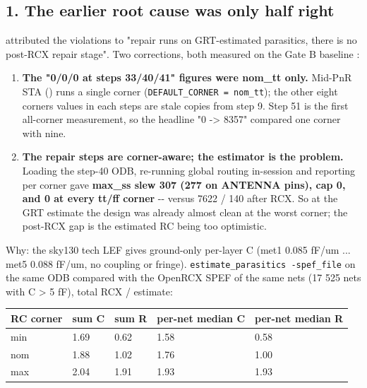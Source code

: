 \subsection{1. The earlier root cause was only half right}\label{cr:defect:sky130-slew-cap-e45j:1-the-earlier-root-cause-was-only-half-right}

\begin{record}

 attributed the violations to "repair runs on GRT-estimated
parasitics, there is no post-RCX repair stage". Two corrections, both
measured on the Gate B baseline :

\begin{enumerate}
\def\labelenumi{\arabic{enumi}.}
\tightlist
\item
  \textbf{The "0/0/0 at steps 33/40/41" figures were nom\_tt only.}
  Mid-PnR STA () runs a single corner
  (\texttt{DEFAULT\_\allowbreak{}CORNER\ =\allowbreak{}\ nom\_\allowbreak{}tt});
  the other eight corners\textquotesingle{} values in each
  step\textquotesingle s  are stale copies from
  step 9. Step 51 is the first all-corner measurement, so the headline
  "0 -\textgreater{} 8357" compared one corner with nine.
\item
  \textbf{The repair steps are corner-aware; the estimator is the
  problem.} Loading the step-40 ODB, re-running global routing
  in-session and reporting per corner gave \textbf{max\_ss slew 307 (277
  on ANTENNA pins), cap 0, and 0 at every tt/ff corner} -\/- versus 7622
  / 140 after RCX. So at the GRT estimate the design was already almost
  clean at the worst corner; the post-RCX gap is the estimated RC being
  too optimistic.
\end{enumerate}

Why: the sky130 tech LEF gives ground-only per-layer C (met1 0.085 fF/um
... met5 0.088 fF/um, no coupling or fringe).
\texttt{estimate\_\allowbreak{}parasitics\ -\allowbreak{}spef\_\allowbreak{}file}
on the same ODB compared with the OpenRCX SPEF of the same nets (17 525
nets with C \textgreater{} 5 fF), total RCX / estimate:

{
\begin{longtable}[]{@{}lllll@{}}
\toprule\noalign{}
RC corner & sum C & sum R & per-net median C & per-net median R \\
\midrule\noalign{}
\endhead
\bottomrule\noalign{}
\endlastfoot
min & 1.69 & 0.62 & 1.58 & 0.58 \\
nom & 1.88 & 1.02 & 1.76 & 1.00 \\
max & 2.04 & 1.91 & 1.93 & 1.93 \\
\end{longtable}
}


\end{record}
